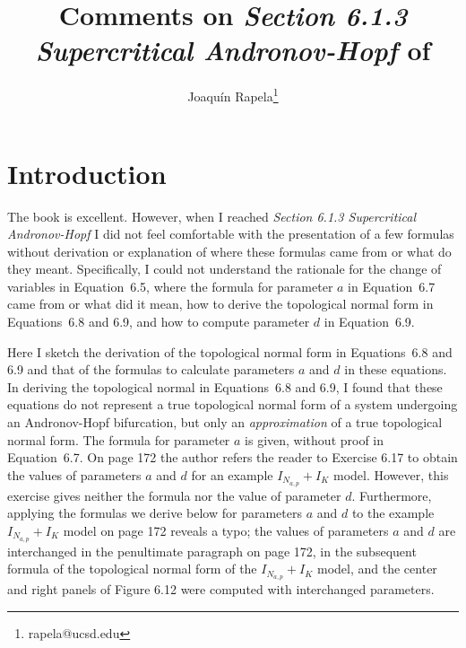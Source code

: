 \documentclass{article}
\theoremstyle{lemma}
\begin{document}
\title{Comments on \emph{Section 6.1.3 Supercritical Andronov-Hopf} of
\citet{izhikevich07}}
\author{Joaqu\'{i}n Rapela\thanks{rapela@ucsd.edu}}
\maketitle

\tableofcontents

\section{Introduction}

The book \citet{izhikevich07} is excellent. 
However, when I reached \emph{Section 6.1.3 Supercritical Andronov-Hopf} I did
not feel comfortable with the presentation of a few formulas without derivation or explanation of where these formulas came from or what do they meant.
Specifically, I could not understand the rationale for the change of variables
in Equation~6.5, where the formula for parameter $a$ in Equation~6.7 came
from or what did it mean, how to derive the topological normal form in
Equations~6.8 and 6.9, and how to compute parameter $d$ in Equation~6.9.

Here I sketch the derivation of the topological normal form in Equations~6.8
and 6.9 and that of the formulas to calculate parameters $a$ and $d$ in
these equations.  In deriving the topological normal in Equations~6.8 and
6.9, I found that these equations do not represent a true topological normal
form of a system undergoing an Andronov-Hopf bifurcation, but only an
\emph{approximation} of a true topological normal form.  The formula for
parameter $a$ is given, without proof in Equation~6.7. On page 172 the
author refers the reader to Exercise 6.17 to obtain the values of parameters
$a$ and $d$ for an example $I_{N_{a,p}}+I_K$ model. However, this exercise
gives neither the formula nor the value of parameter $d$.  Furthermore,
applying the formulas we derive below for parameters $a$ and $d$ to the
example $I_{N_{a,p}}+I_K$ model on page 172 reveals a typo; the values of
parameters $a$ and $d$ are interchanged in the penultimate paragraph on page 172,
in the subsequent formula of the topological normal form of the
$I_{N_{a,p}}+I_K$ model, and the center and right panels of Figure 6.12 were
computed with interchanged parameters.
\end{document}
